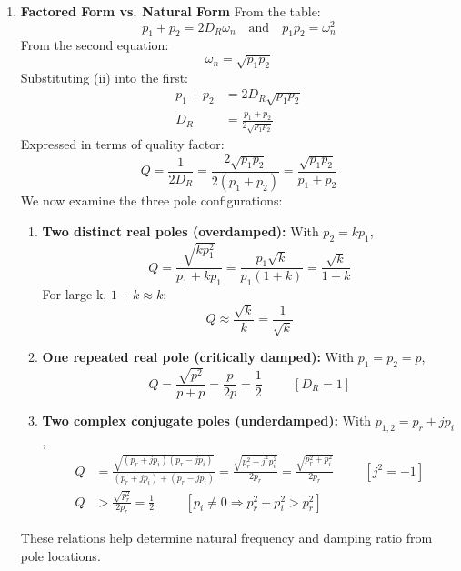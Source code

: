 \begin{enumerate}
    \[ Q = \frac{1}{2\cdot\frac{a_1}{2\sqrt{a_0 a_2}}} = \frac{\sqrt{a_0 a_2}}{a_1} \]
    Unlike the factored form, comparison with the natural form does
    not require separate algebraic cases; the three damping regimes
    emerge solely from the numerical value of \(D_R\). These
    relations help determine natural frequency and damping ratio from
    polynomial coefficients.
  \item \textbf{Factored Form vs. Natural Form}
    \noindent From the table:
    \[ p_1 + p_2 = 2D_R\omega_n \quad \text{and} \quad p_1 p_2 = \omega_n^2 \]
    From the second equation:
    \[ \omega_n = \sqrt{p_1 p_2} \tag{ii} \]
    Substituting (ii) into the first:
    \begin{align*}
      p_1 + p_2 &= 2D_R \sqrt{p_1 p_2} \\
      D_R &= \frac{p_1 + p_2}{2\sqrt{p_1 p_2}}
    \end{align*}
    Expressed in terms of quality factor:
    \[ Q = \frac{1}{2D_R} = \frac{2\sqrt{p_1 p_2}}{2(p_1 + p_2)} = \frac{\sqrt{p_1 p_2}}{p_1 + p_2}\]
    We now examine the three pole configurations:
    \begin{enumerate}
      \item \textbf{Two distinct real poles (overdamped):} With \( p_2 = k p_1 \),
        \[ Q = \frac{\sqrt{k p_1^2}}{p_1 + k p_1} = \frac{p_1\sqrt{k}}{p_1(1+k)} = \frac{\sqrt{k}}{1+k} \]
        For large k, \(1 + k \approx k\):
        \[ Q \approx \frac{\sqrt{k}}{k} = \frac{1}{\sqrt{k}} \]
      \item \textbf{One repeated real pole (critically damped):} With \( p_1 = p_2 = p \),
        \[ Q = \frac{\sqrt{p^2}}{p + p} = \frac{p}{2p} = \frac{1}{2} \hspace{1cm} [D_R = 1] \]
      \item \textbf{Two complex conjugate poles (underdamped):} With \( p_{1,2} = p_r \pm j p_i \),
        \begin{align*}
           Q &= \frac{\sqrt{(p_r + j p_i)(p_r - j p_i)}}{(p_r + j p_i) + (p_r - j p_i)}
           = \frac{\sqrt{p_r^2 - j^2 p_i^2}}{2p_r} = \frac{\sqrt{p_r^2 + p_i^2}}{2p_r} \hspace{1cm} [j^2 = -1] \\
           Q &> \frac{\sqrt{p_r^2}}{2p_r} = \frac{1}{2} \hspace{1cm} [p_i \neq 0 \Rightarrow p_r^2 + p_i^2 > p_r^2]
         \end{align*}
    \end{enumerate}
    These relations help determine natural frequency and
    damping ratio from pole locations.
\end{enumerate}
